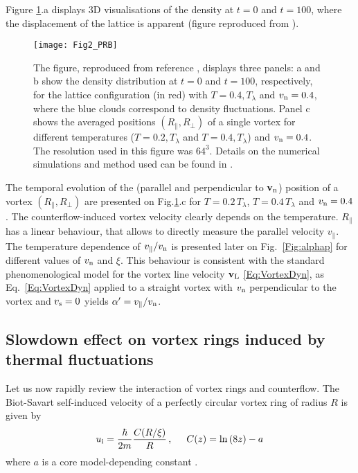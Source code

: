 \documentclass[sn-mathphys]{sn-jnl}%
\begin{document}
Figure \ref{Fig:Lattice}.a displays $3$D visualisations of the density at $t=0$ and $t=100$, where the displacement of the lattice is apparent (figure reproduced from \cite{Krstulovic11b}). 
\begin{figure}[htbp]
\begin{center}
\texttt{[image: Fig2\_PRB]}
\caption{The figure, reproduced from reference \cite{Krstulovic11b}, displays three panels: a and b show the density distribution at $t=0$ and $t=100$, respectively, for the lattice configuration (in red) with $T=0.4,T_\lambda$ and $v_{\rm n}=0.4$, where the blue clouds correspond to density fluctuations. Panel c shows the {averaged} positions $(R_{\parallel},R_{\perp})$ of a single vortex for different temperatures ($T=0.2,T_\lambda$ and $T=0.4,T_\lambda$) and $v_{\rm n}=0.4$. The resolution used in this figure was $64^3$. {Details on the numerical simulations and method used can be found in \cite{Krstulovic11b}.} }
\label{Fig:Lattice}
\end{center}
\end{figure}
The temporal evolution of the (parallel and perpendicular to ${\bf v}_{\rm n}$) position of a vortex $(R_{\parallel},R_{\perp})$  
are presented on Fig.\ref{Fig:Lattice}.c for $T=0.2\,T_\lambda$, $T= 0.4\,T_\lambda$ and $v_{\rm n}=0.4$. 
The counterflow-induced vortex velocity clearly depends on the temperature. 
%
$R_{\parallel}$ has a linear behaviour, that allows to directly measure the parallel velocity $v_{\parallel}$. The temperature dependence of $v_{\parallel}/v_{\rm n}$ is presented later on Fig.~\ref{Fig:alphap} for different values of $v_{\rm n}$ and $\xi$. This behaviour is consistent with the standard phenomenological model for the vortex line velocity ${\bf v}_{\rm L}$ \eqref{Eq:VortexDyn}, as Eq.~\eqref{Eq:VortexDyn} applied to a straight vortex with $v_{\rm n}$ perpendicular to the vortex and $v_{\rm s}=0$ yields $\alpha'=v_{\parallel}/v_{\rm n}$. 

\subsection{Slowdown effect on vortex rings induced by thermal fluctuations}\label{sec:rings}
Let us now rapidly review the interaction of vortex rings and counterflow. 
The Biot-Savart self-induced velocity of a perfectly circular vortex ring of radius $R$ is given by
\begin{equation}
u_{\rm i}=\frac{\hbar}{2m}\frac{C(R/\xi)}{R}\,,\hspace{5mm} C(z)=\ln{(8z)}-a \label{Eq:ui}
\end{equation} 
where $a$ is a core model-depending constant \cite{Donnelly}. 
\end{document}

